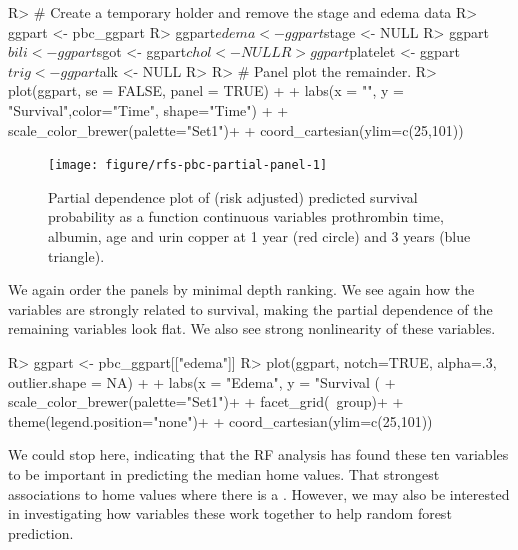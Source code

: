 \documentclass[nojss]{jss}\usepackage[]{graphicx}\usepackage[]{color}
\begin{document}
\begin{Schunk}
\begin{Sinput}
R> # Create a temporary holder and remove the stage and edema data
R> ggpart <- pbc_ggpart
R> ggpart$edema <- ggpart$stage <- NULL
R> ggpart$bili <- ggpart$sgot <- ggpart$chol <- NULL
R> ggpart$platelet <- ggpart$trig <- ggpart$alk <- NULL
R> 
R> # Panel plot the remainder.
R> plot(ggpart, se = FALSE, panel = TRUE) + 
+   labs(x = "", y = "Survival",color="Time", shape="Time") +
+   scale_color_brewer(palette="Set1")+
+   coord_cartesian(ylim=c(25,101))
\end{Sinput}
\begin{figure}[!htpb]

{\centering \texttt{[image: figure/rfs-pbc-partial-panel-1]} 

}

\caption[Partial dependence plot of (risk adjusted) predicted survival probability as a function continuous variables prothrombin time, albumin, age and urin copper at 1 year (red circle) and 3 years (blue triangle)]{Partial dependence plot of (risk adjusted) predicted survival probability as a function continuous variables prothrombin time, albumin, age and urin copper at 1 year (red circle) and 3 years (blue triangle).\label{fig:pbc-partial-panel}}
\end{figure}
\end{Schunk}

We again order the panels by minimal depth ranking. We see again how the  variables are strongly related to survival, making the partial dependence of the remaining variables look flat. We also see strong nonlinearity of these variables.

\begin{Schunk}
\begin{Sinput}
R> ggpart <- pbc_ggpart[["edema"]]
R> plot(ggpart, notch=TRUE, alpha=.3, outlier.shape = NA) + 
+   labs(x = "Edema", y = "Survival (%
+   scale_color_brewer(palette="Set1")+
+   facet_grid(~group)+
+   theme(legend.position="none")+
+   coord_cartesian(ylim=c(25,101))
\end{Sinput}
\end{Schunk}

We could stop here, indicating that the RF analysis has found these ten variables to be important in predicting the median home values. That strongest associations to home values where there is a . However, we may also be interested in investigating how variables these work together to help random forest prediction.
\end{document}
